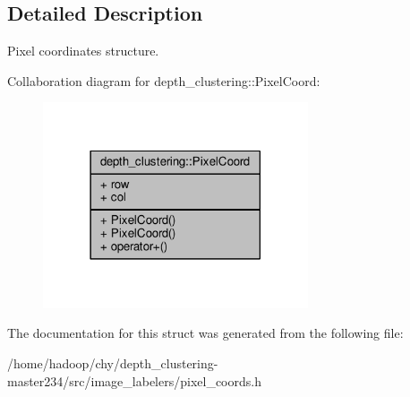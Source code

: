 \subsection{Detailed Description}
Pixel coordinates structure. 

Collaboration diagram for depth\-\_\-clustering\-:\-:Pixel\-Coord\-:
\nopagebreak
\begin{figure}[H]
\begin{center}
\leavevmode
\includegraphics[width=222pt]{structdepth__clustering_1_1PixelCoord__coll__graph}
\end{center}
\end{figure}


The documentation for this struct was generated from the following file\-:\begin{DoxyCompactItemize}
\item 
/home/hadoop/chy/depth\-\_\-clustering-\/master234/src/image\-\_\-labelers/pixel\-\_\-coords.\-h\end{DoxyCompactItemize}
